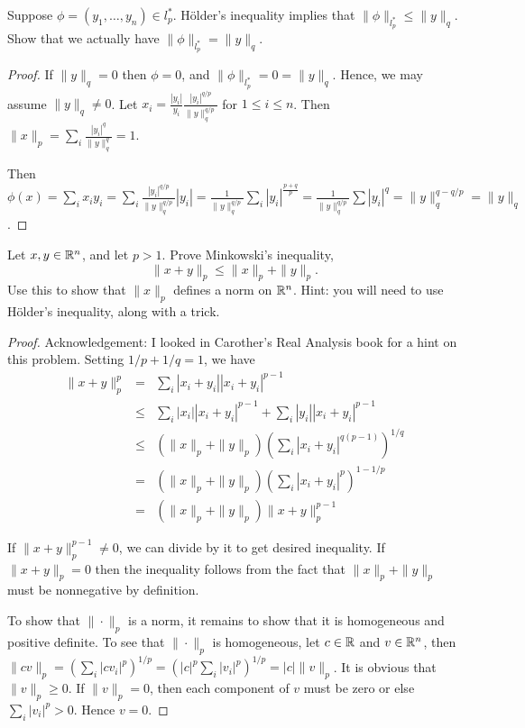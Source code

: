 \documentclass{article}
\begin{document}
 Suppose $\phi =(y_1, \ldots, y_n) \in l_p^*$. H\"{o}lder's inequality implies that $\|\phi\|_{l_p^*} \le \|y\|_q$. Show that we actually have $\|\phi\|_{l_p^*}  = \|y \|_q$.
\begin{proof}
If $\|y\|_q = 0$ then $\phi = 0$, and $\|\phi\|_{l_p^*} = 0 = \|y\|_q$.  Hence, we may assume $\|y\|_q \neq 0$.
Let $x_i = \frac {|y_i|} {y_i} \frac {|y_i|^{q/p}}{\|y\|_q^{q/p}}$ for $1 \le i \le n$.  Then $\|x\|_p = \sum_i \frac {|y_i|^q} {\|y\|_q^q} = 1$.

Then $\phi(x) = \sum_i x_i y_i = \sum_i \frac {|y_i|^{q/p}}{\|y\|_q^{q/p}} |y_i| = \frac 1 {\|y\|_q^{q/p}} \sum_i |y_i|^{\frac {p + q} p }  = \frac 1 {\|y\|_q^{q/p}} \sum |y_i|^q = \|y\|_q^{q - q/p} = \|y\|_q$.

\end{proof}

 Let $x,y \in \mathbb{R}^n$, and let $p > 1$. Prove Minkowski's inequality, 
$$\|x + y \|_p \le \|x\|_p + \|y\|_p. $$
Use this to show that $\|x\|_p$ defines a norm on $\mathbb{R}^n$. Hint: you will need to use H\"{o}lder's inequality, along with a trick.

\begin{proof}
Acknowledgement: I looked in Carother's Real Analysis book for a hint on this problem. Setting $1/p + 1/q = 1$, we have 
\begin{align*}
\|x + y \|_p^p & = & \sum_i |x_i + y_i| |x_i + y_i|^{p-1}
\\ & \le & \sum_i |x_i| |x_i + y_i|^{p-1} + \sum_i |y_i| |x_i + y_i|^{p-1}
\\ & \le & ( \|x\|_p + \|y\|_p) \left( \sum_i |x_i + y_i|^{q(p-1)} \right)^{1/q}
\\ & = & ( \|x\|_p + \|y\|_p) \left( \sum_i |x_i + y_i|^p \right)^{1 - 1/p}
\\ & = &  ( \|x\|_p + \|y\|_p) \|x + y \|_p^{p - 1}
\end{align*}

If $\|x + y\|_p^{p-1} \neq 0$, we can divide by it to get desired inequality. If $\|x + y \|_p = 0$ then the inequality follows from the fact that $\|x\|_p + \|y\|_p$ must be nonnegative by definition.

To show that $\| \cdot \|_p$ is a norm, it remains to show that it is homogeneous and positive definite. To see that $\| \cdot \|_p$ is homogeneous, let $c \in \mathbb{R}$ and $v \in \mathbb{R}^n$, then $\|c v\|_p = \left( \sum_i |c v_i|^p \right)^{1/p} = \left(|c|^p \sum_i | v_i|^p \right)^{1/p} = |c| \|v\|_p$. It is obvious that $\|v\|_p \ge 0$.  If $\|v\|_p = 0$, then each component of $v$ must be zero or else $\sum_i |v_i|^p > 0$. Hence $v = 0$.

\end{proof}
\end{document}
